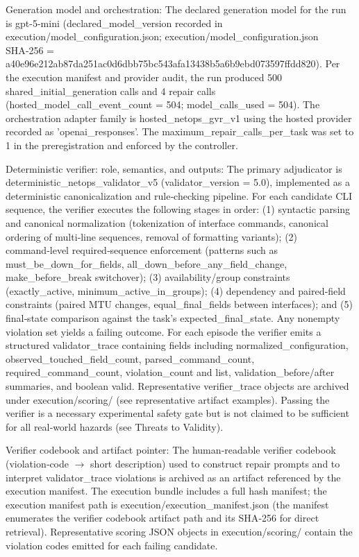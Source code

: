 \documentclass[conference]{IEEEtran}
\begin{document}
Generation model and orchestration: The declared generation model for the run is gpt-5-mini (declared\_model\_version recorded in execution/model\_configuration.json; execution/model\_configuration.json SHA‑256 = a40e96e2\allowbreak{}12ab87da\allowbreak{}251ac0d6\allowbreak{}dbb75bc5\allowbreak{}43afa134\allowbreak{}38b5a6b9\allowbreak{}ebd07359\allowbreak{}7ffdd820). Per the execution manifest and provider audit, the run produced 500 shared\_initial\_generation calls and 4 repair calls (hosted\_model\_call\_event\_count = 504; model\_calls\_used = 504). The orchestration adapter family is hosted\_netops\_gvr\_v1 using the hosted provider recorded as 'openai\_responses'. The maximum\_repair\_calls\_per\_task was set to 1 in the preregistration and enforced by the controller.

Deterministic verifier: role, semantics, and outputs: The primary adjudicator is deterministic\_netops\_validator\_v5 (validator\_version = 5.0), implemented as a deterministic canonicalization and rule‑checking pipeline. For each candidate CLI sequence, the verifier executes the following stages in order: (1) syntactic parsing and canonical normalization (tokenization of interface commands, canonical ordering of multi‑line sequences, removal of formatting variants); (2) command‑level required‑sequence enforcement (patterns such as must\_be\_down\_for\_fields, all\_down\_before\_any\_field\_change, make\_before\_break switchover); (3) availability/group constraints (exactly\_active, minimum\_active\_in\_groups); (4) dependency and paired‑field constraints (paired MTU changes, equal\_final\_fields between interfaces); and (5) final‑state comparison against the task's expected\_final\_state. Any nonempty violation set yields a failing outcome. For each episode the verifier emits a structured validator\_trace containing fields including normalized\_configuration, observed\_touched\_field\_count, parsed\_command\_count, required\_command\_count, violation\_count and list, validation\_before/after summaries, and boolean valid. Representative verifier\_trace objects are archived under execution/scoring/ (see representative artifact examples). Passing the verifier is a necessary experimental safety gate but is not claimed to be sufficient for all real‑world hazards (see Threats to Validity).

Verifier codebook and artifact pointer: The human‑readable verifier codebook (violation‑code \ensuremath{\rightarrow} short description) used to construct repair prompts and to interpret validator\_trace violations is archived as an artifact referenced by the execution manifest. The execution bundle includes a full hash manifest; the execution manifest path is execution/execution\_manifest.json (the manifest enumerates the verifier codebook artifact path and its SHA‑256 for direct retrieval). Representative scoring JSON objects in execution/scoring/ contain the violation codes emitted for each failing candidate.
\end{document}
